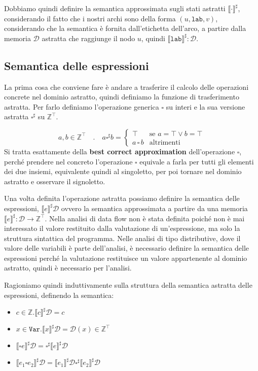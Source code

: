 Dobbiamo quindi definire la semantica approssimata sugli stati astratti
$\llbracket \cdot \rrbracket^\sharp$, considerando 
il fatto che i nostri archi sono della forma $(u, \texttt{lab}, v)$, considerando che la 
semantica è fornita dall'etichetta dell'arco, a partire dalla memoria $\mathcal{D}$ astratta 
che raggiunge il nodo $u$, quindi $\llbracket \texttt{lab} \rrbracket^\sharp : \mathcal{D}$. 
\subsection{Semantica delle espressioni}
La prima cosa che conviene fare è andare a trasferire il calcolo delle operazioni concrete 
nel dominio astratto, quindi definiamo la funzione di trasferimento astratta.
Per farlo definiamo l'operazione generica $\square$ su interi e la sua versione astratta
$\square^\sharp$ su $\mathbb{Z}^\top$.

\[
  a,b \in \mathbb{Z}^\top \quad . \quad a \square^\sharp b =
  \begin{cases}
    \top & \text{se } a = \top \lor b = \top \\
    a\, \square\, b & \text{altrimenti}
  \end{cases}
\]
Si tratta esattamente della \textbf{best correct approximation} dell'operazione $\square$, 
perché prendere nel concreto l'operazione $\square$ equivale a farla per tutti gli elementi 
dei due insiemi, equivalente quindi al singoletto, per poi tornare nel dominio astratto 
e osservare il signoletto.

Una volta definita l'operazione astratta possiamo definire la semantica delle espressioni, 
$\llbracket e \rrbracket ^\sharp \mathcal{D}$ ovvero la semantica approssimata a partire da una memoria $\llbracket e \rrbracket^\sharp :
\mathcal{D} \to \mathbb{Z}^\top$. Nella analisi di data flow non è stata definita poiché 
non è mai interessato il valore restituito dalla valutazione di un'espressione, ma solo
la struttura sintattica del programma. Nelle analisi di tipo distributive, dove il valore delle 
variabili è parte dell'analisi, è necessario definire la semantica delle espressioni perché 
la valutazione restituisce un valore appartenente al dominio astratto, quindi è necessario
per l'analisi.

Ragioniamo quindi induttivamente sulla struttura della semantica 
astratta delle espressioni, definendo la semantica:
\begin{itemize}
  \item $c \in \mathbb{Z} . \llbracket c \rrbracket^\sharp \mathcal{D} = c$
  \item $x \in \texttt{Var} . \llbracket x \rrbracket^\sharp \mathcal{D} =
  \mathcal{D}(x) \in \mathbb{Z}^\top$
  \item $\llbracket \square e \rrbracket^\sharp \mathcal{D} =
  \square^\sharp \llbracket e \rrbracket^\sharp \mathcal{D}$
  \item $\llbracket e_1 \square e_2 \rrbracket^\sharp \mathcal{D} = 
  \llbracket e_1 \rrbracket^\sharp \mathcal{D} \square^\sharp \llbracket e_2 \rrbracket^\sharp \mathcal{D}$
\end{itemize}
